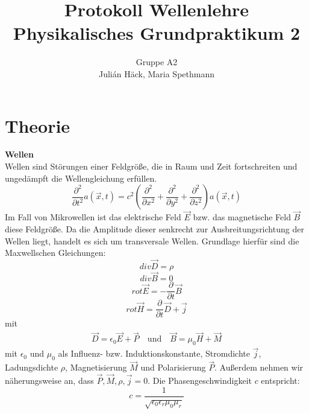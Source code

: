 \documentclass[12pt,a4paper]{article}
\author{Gruppe A2 \\ Julián Häck, Maria Spethmann}
\title{Protokoll Wellenlehre \\ Physikalisches Grundpraktikum 2}
\begin{document}
	\maketitle\thispagestyle{empty} %
	\newpage
	\pagestyle{headings} %
	\tableofcontents
	\newpage

\section{Theorie}

\textbf{Wellen} \\
Wellen sind Störungen einer Feldgröße, die in Raum und Zeit fortschreiten und ungedämpft die Wellengleichung erfüllen.
\begin{equation}
\frac{\partial^2}{\partial t^2} a(\vec{x},t)= c^2 \left(\frac{\partial^2}{\partial x^2} + \frac{\partial^2}{\partial y^2} + \frac{\partial^2}{\partial z^2}\right) a(\vec{x}, t)
\end{equation} 
Im Fall von Mikrowellen ist das elektrische Feld $\vec{E}$ bzw. das magnetische Feld $\vec{B}$ diese Feldgröße. Da die Amplitude dieser senkrecht zur Ausbreitungsrichtung der Wellen liegt, handelt es sich um transversale Wellen. Grundlage hierfür sind die Maxwellschen Gleichungen:
\begin{equation}
div\vec{D} = \rho
\end{equation}
\begin{equation}
div\vec{B} = 0
\end{equation}
\begin{equation}
rot\vec{E} = -\frac{\partial}{\partial t}\vec{B}
\end{equation}
\begin{equation}
rot\vec{H} = \frac{\partial}{\partial t}\vec{D} + \vec{j}
\end{equation}
mit
\begin{align*}
\vec{D} = \epsilon_0\vec{E} + \vec{P} \quad \text{und} \quad \vec{B} = \mu_0\vec{H} + \vec{M}
\end{align*}
mit $\epsilon_0$ und $\mu_0$ als Influenz- bzw. Induktionskonstante, Stromdichte $\vec{j}$, Ladungsdichte $\rho$, Magnetisierung $\vec{M}$ und Polarisierung $\vec{P}$. Außerdem nehmen wir näherungsweise an, dass $\vec{P},\vec{M},\rho,\vec{j}=0$.\newline
Die Phasengeschwindigkeit $c$ entspricht:
\begin{equation}
c=\frac{1}{\sqrt{\epsilon_0\epsilon_r\mu_0\mu_r}}
\end{equation}
\end{document}
